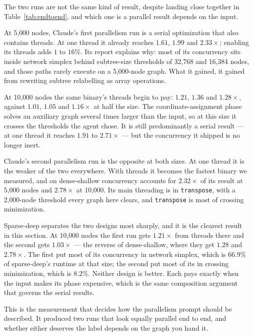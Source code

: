 The two runs are not the same kind of result, despite landing close together in
Table~\ref{tab:endtoend}, and which one is a parallel result depends on the
input.

At 5{,}000 nodes, Claude's first parallelism run is a serial optimization that
also contains threads. At one thread it already reaches $1.61$, $1.99$ and
$2.33\times$; enabling its threads adds $1$ to $16\%$. Its report explains why:
most of its concurrency sits inside network simplex behind subtree-size thresholds of
32{,}768 and 16{,}384 nodes, and those paths rarely execute on a 5{,}000-node
graph. What it gained, it gained from rewriting subtree relabelling as array
operations.

At 10{,}000 nodes the same binary's threads begin to pay: $1.21$, $1.36$ and
$1.28\times$, against $1.01$, $1.05$ and $1.16\times$ at half the size. The
coordinate-assignment phase solves an auxiliary graph several times larger than
the input, so at this size it crosses the thresholds the agent chose. It is
still predominantly a serial result --- at one thread it reaches $1.91$ to
$2.71\times$ --- but the concurrency it shipped is no longer inert.

Claude's second parallelism run is the opposite at both sizes. At one thread it
is the weaker of the two everywhere. With threads it becomes the fastest binary
we measured, and on dense-shallow concurrency accounts for $2.32\times$ of its
result at 5{,}000 nodes and $2.78\times$ at 10{,}000. Its main threading is in
\texttt{transpose}, with a 2{,}000-node threshold every graph here clears, and
\texttt{transpose} is most of crossing minimization.

Sparse-deep separates the two designs most sharply, and it is the clearest
result in this section. At 10{,}000 nodes the first run gets $1.21\times$ from
threads there and the second gets $1.03\times$ --- the reverse of dense-shallow,
where they get $1.28$ and $2.78\times$. The first put most of its concurrency in network
simplex, which is $66.9\%$ of sparse-deep's runtime at that size; the second put
most of its in crossing minimization, which is $8.2\%$. Neither design is better. Each
pays exactly when the input makes its phase expensive, which is the same
composition argument that governs the serial results.

This is the measurement that decides how the parallelism prompt should be
described. It produced two runs that look equally parallel end to end, and
whether either deserves the label depends on the graph you hand it.

